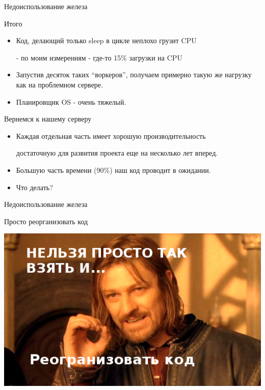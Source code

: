 \documentclass[aspectratio=169]{beamer}
\begin{document}
\begin{frame}{Недоиспользование железа}
    \begin{block}{Итого}
        \begin{itemize}
            \item Код, делающий только sleep в цикле неплохо грузит CPU
                \par - по моим измерениям - где-то 15\% загрузки на CPU
            \item Запустив десяток таких ``воркеров'', получаем
                примерно такую же нагрузку как на проблемном сервере.
            \par
            \item Планировщик OS - очень тяжелый.
        \end{itemize}
    \end{block}

    \pause
    \begin{block}{Вернемся к нашему серверу}
        \begin{itemize}
            \item Каждая отдельная часть имеет хорошую производительность
                \par достаточную для развития
                            проекта еще на несколько лет вперед.
            \item Большую часть времени (90\%) наш код проводит
                        в ожидании.

            \item Что делать?
        \end{itemize}
    \end{block}
\end{frame}

\begin{frame}{Недоиспользование железа}
    \begin{block}
        {\huge Просто реорганизовать код}
            \begin{center}
                \pause\includegraphics[scale=0.35]{img/nelzya.png}
            \end{center}
    \end{block}
\end{frame}
\end{document}
